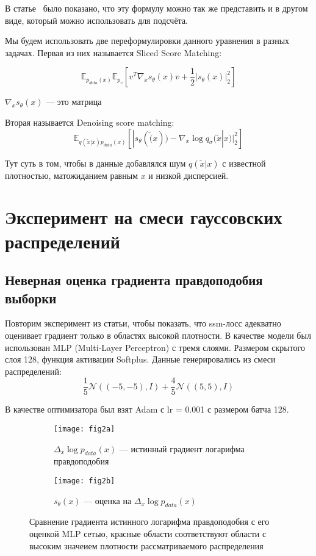 \documentclass{article}
\begin{document}
В статье~\cite{sliced_score_matching} было показано, что эту формулу можно так
же представить и в другом виде, который можно использовать для подсчёта.

Мы будем использовать две переформулировки данного уравнения в разных задачах.
Первая из них называется Sliced Score Matching: 

\begin{equation}
    \mathbb{E}_{p_{data}(x)} \mathbb{E}_{p_v} \left[ v^T \nabla_x s_{\theta}(x) v + \frac{1}{2} |s_{\theta}(x)|_2^2 \right]
    \label{eq:sliced_score_matching}
\end{equation}

$\nabla_x s_{\theta}(x)$ --- это матрица 

Вторая называется Denoising score matching:
\begin{equation}
    \mathbb{E}_{q(\tilde{x} | x)p_{data}(x)} \left[ |s_{\theta}(\tilde(x)) - \nabla_x \log q_{\sigma}(\tilde{x} | x)|_2^2 \right]
    \label{eq:denoising_score_matching}
\end{equation}

Тут суть в том, чтобы в данные добавлялся шум $q(\tilde{x} | x)$ с известной
плотностью, матожиданием равным $x$ и низкой дисперсией.


\section{Эксперимент на смеси гауссовских распределений}

\subsection{Неверная оценка градиента правдоподобия выборки}
Повторим эксперимент из статьи, чтобы показать, что ssm-лосс адекватно
оценивает градиент только в областях высокой плотности. В качестве модели был
использован MLP (Multi-Layer Perceptron) с тремя слоями. Размером скрытого слоя
128, функция активации Softplus. Данные генерировались из смеси распределений:
\[
\frac{1}{5} \mathcal{N}\left( \left( -5, -5\right), I \right)+\frac{4}{5} \mathcal{N}\left( \left( 5, 5\right), I \right)
\]

В качестве оптимизатора был взят Adam с lr = 0.001 с размером батча 128. 

\begin{figure}[H]
  \centering
  \begin{subfigure}[b]{0.45\textwidth}
  	\texttt{[image: fig2a]}
  	\caption{$\Delta_x \log p_{data}(x)$ --- истинный градиент логарифма правдоподобия}
  	\label{fig:2a}
  \end{subfigure}
  \begin{subfigure}[b]{0.45\textwidth}
    \centering
    \texttt{[image: fig2b]}
    \caption{$s_{\theta}(x)$ --- оценка на $\Delta_x \log p_{data}(x)$}
    \label{fig:2b}
  \end{subfigure}
  \caption{Сравнение градиента истинного логарифма правдоподобия с его оценкой
  MLP сетью, красные области соответствуют области с высоким значеием плотности
  рассматриваемого распределения}
  \label{fig:2}
\end{figure}
\end{document}
